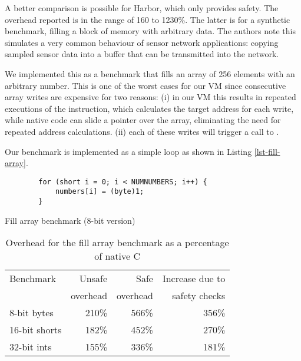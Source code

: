 A better comparison is possible for Harbor, which only provides safety. The overhead reported is in the range of 160 to 1230\%. The latter is for a synthetic benchmark, filling a block of memory with arbitrary data. The authors note this simulates a very common behaviour of sensor network applications: copying sampled sensor data into a buffer that can be transmitted into the network.

We implemented this as a benchmark that fills an array of 256 elements with an arbitrary number. This is one of the worst cases for our VM since consecutive array writes are expensive for two reasons: (i) in our VM this results in repeated executions of the  instruction, which calculates the target address for each write, while native code can slide a pointer over the array, eliminating the need for repeated address calculations. (ii) each of these writes will trigger a call to .

Our benchmark is implemented as a simple loop as shown in Listing \ref{lst-fill-array}.

\begin{listing}[H]
	\centering
 	\begin{verbatim}
        for (short i = 0; i < NUMNUMBERS; i++) {
            numbers[i] = (byte)1;
        }
	\end{verbatim}
	\caption{Fill array benchmark (8-bit version)}
	\label{lst-fill-array}
\end{listing}

\begin{table}[]
 \centering
 \caption{Overhead for the fill array benchmark as a percentage of native C}
 \label{tbl-fill-array-results}
\begin{tabular}{lrrr}
\toprule
Benchmark & Unsafe & Safe & Increase due to \\
 & overhead & overhead & safety checks \\
\midrule
8-bit  bytes  & 210\% & 566\% & 356\% \\
16-bit shorts & 182\% & 452\% & 270\% \\
32-bit ints   & 155\% & 336\% & 181\% \\
\bottomrule
\end{tabular}
\end{table}

